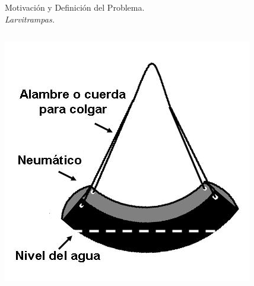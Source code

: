 \begin{frame}[t]{Motivación y Definición del Problema.\\\textit{Larvitrampas.}}
  \begin{center}
    \begin{columns}[c]
        \begin{column}[c]{3cm}
          \includegraphics[width=\textwidth]{../book/anexos/graphics/disenho-1.png}


\end{column}
\end{columns}
\end{center}
\end{frame}
